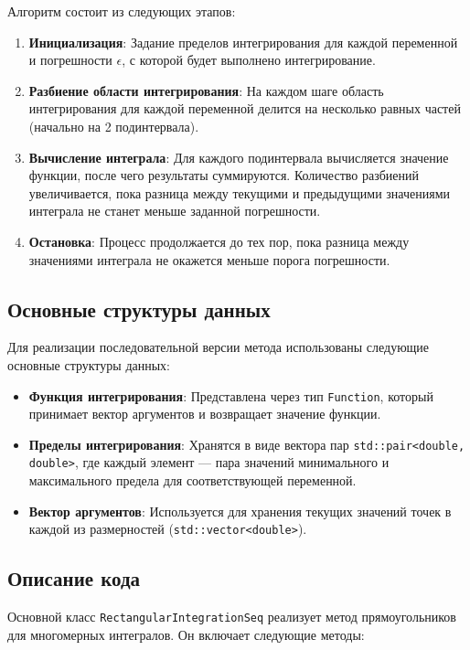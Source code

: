 \documentclass[12pt]{article}
\begin{document}
Алгоритм состоит из следующих этапов:

\begin{enumerate}
\item \textbf{Инициализация}: Задание пределов интегрирования для каждой переменной и погрешности \(\epsilon\), с которой будет выполнено интегрирование.
\item \textbf{Разбиение области интегрирования}: На каждом шаге область интегрирования для каждой переменной делится на несколько равных частей (начально на 2 подинтервала).
\item \textbf{Вычисление интеграла}: Для каждого подинтервала вычисляется значение функции, после чего результаты суммируются. Количество разбиений увеличивается, пока разница между текущими и предыдущими значениями интеграла не станет меньше заданной погрешности.
\item \textbf{Остановка}: Процесс продолжается до тех пор, пока разница между значениями интеграла не окажется меньше порога погрешности.
\end{enumerate}

\subsection*{Основные структуры данных}

Для реализации последовательной версии метода использованы следующие основные структуры данных:

\begin{itemize}
\item \textbf{Функция интегрирования}: Представлена через тип \texttt{Function}, который принимает вектор аргументов и возвращает значение функции.
\item \textbf{Пределы интегрирования}: Хранятся в виде вектора пар \texttt{std::pair<double, double>}, где каждый элемент — пара значений минимального и максимального предела для соответствующей переменной.
\item \textbf{Вектор аргументов}: Используется для хранения текущих значений точек в каждой из размерностей (\texttt{std::vector<double>}).
\end{itemize}

\subsection*{Описание кода}

Основной класс \texttt{RectangularIntegrationSeq} реализует метод прямоугольников для многомерных интегралов. Он включает следующие методы:
\end{document}
